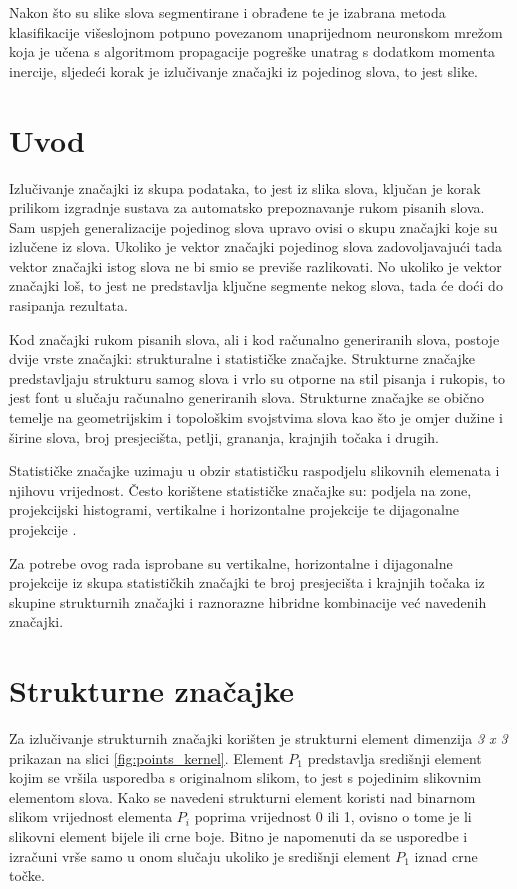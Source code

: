 Nakon što su slike slova segmentirane i obrađene te je izabrana metoda klasifikacije višeslojnom potpuno povezanom unaprijednom neuronskom mrežom koja je učena s algoritmom propagacije pogreške unatrag s dodatkom momenta inercije, sljedeći korak je izlučivanje značajki iz pojedinog slova, to jest slike.

\section{Uvod}

Izlučivanje značajki iz skupa podataka, to jest iz slika slova, ključan je korak prilikom izgradnje sustava za automatsko prepoznavanje rukom pisanih slova. Sam uspjeh generalizacije pojedinog slova upravo ovisi o skupu značajki koje su izlučene iz slova. Ukoliko je vektor značajki pojedinog slova zadovoljavajući tada vektor značajki istog slova ne bi smio se previše razlikovati. No ukoliko je vektor značajki loš, to jest ne predstavlja ključne segmente nekog slova, tada će doći do rasipanja rezultata.

Kod značajki rukom pisanih slova, ali i kod računalno generiranih slova, postoje dvije vrste značajki: strukturalne i statističke značajke. Strukturne značajke predstavljaju strukturu samog slova i vrlo su otporne na stil pisanja i rukopis, to jest font u slučaju računalno generiranih slova. Strukturne značajke se obično temelje na geometrijskim i topološkim svojstvima slova kao što je omjer dužine i širine slova, broj presjecišta, petlji, grananja, krajnjih točaka i drugih.

Statističke značajke uzimaju u obzir statističku raspodjelu slikovnih elemenata i njihovu vrijednost. Često korištene statističke značajke su: podjela na zone, projekcijski histogrami, vertikalne i horizontalne projekcije te dijagonalne projekcije \citep{diagonal2011}.

Za potrebe ovog rada isprobane su vertikalne, horizontalne i dijagonalne projekcije iz skupa statističkih značajki te broj presjecišta i krajnjih točaka iz skupine strukturnih značajki i raznorazne hibridne kombinacije već navedenih značajki.

\section{Strukturne značajke}

Za izlučivanje strukturnih značajki korišten je strukturni element dimenzija \emph{3 x 3} prikazan na slici \ref{fig:points_kernel}. Element $P_1$ predstavlja središnji element kojim se vršila usporedba s originalnom slikom, to jest s pojedinim slikovnim elementom slova. Kako se navedeni strukturni element koristi nad binarnom slikom vrijednost elementa $P_i$ poprima vrijednost 0 ili 1, ovisno o tome je li slikovni element bijele ili crne boje. Bitno je napomenuti da se usporedbe i izračuni vrše samo u onom slučaju ukoliko je središnji element $P_1$ iznad crne točke. 

